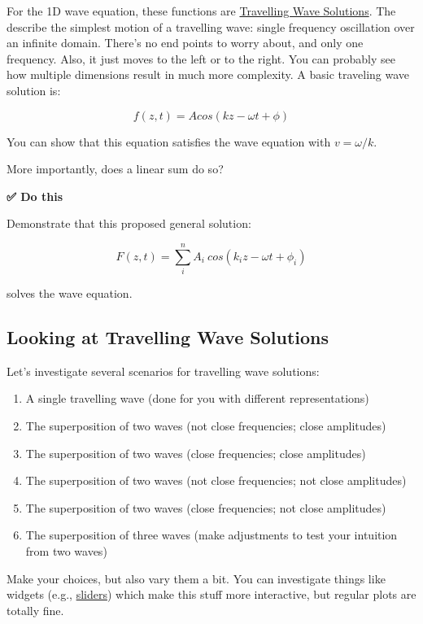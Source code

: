 For the 1D wave equation, these functions are
\href{https://en.wikipedia.org/wiki/Periodic_travelling_wave}{Travelling
Wave Solutions}. The describe the simplest motion of a travelling wave:
single frequency oscillation over an infinite domain. There's no end
points to worry about, and only one frequency. Also, it just moves to
the left or to the right. You can probably see how multiple dimensions
result in much more complexity. A basic traveling wave solution is:

\[f(z,t) = A cos(kz-\omega t+\phi)\]

You can show that this equation satisfies the wave equation with
\(v=\omega/k\).

More importantly, does a linear sum do so?

\textbf{✅ Do this}

Demonstrate that this proposed general solution:

\[F(z,t) = \sum_i^n A_i\:cos(k_i z - \omega t + \phi_i)\]

solves the wave equation.

\subsection{Looking at Travelling Wave
Solutions}\label{looking-at-travelling-wave-solutions}

Let's investigate several scenarios for travelling wave solutions:

\begin{enumerate}
\def\labelenumi{\arabic{enumi}.}
\tightlist
\item
  A single travelling wave (done for you with different representations)
\item
  The superposition of two waves (not close frequencies; close
  amplitudes)
\item
  The superposition of two waves (close frequencies; close amplitudes)
\item
  The superposition of two waves (not close frequencies; not close
  amplitudes)
\item
  The superposition of two waves (close frequencies; not close
  amplitudes)
\item
  The superposition of three waves (make adjustments to test your
  intuition from two waves)
\end{enumerate}

Make your choices, but also vary them a bit. You can investigate things
like widgets (e.g.,
\href{https://matplotlib.org/stable/gallery/widgets/slider_demo.html}{sliders})
which make this stuff more interactive, but regular plots are totally
fine.

